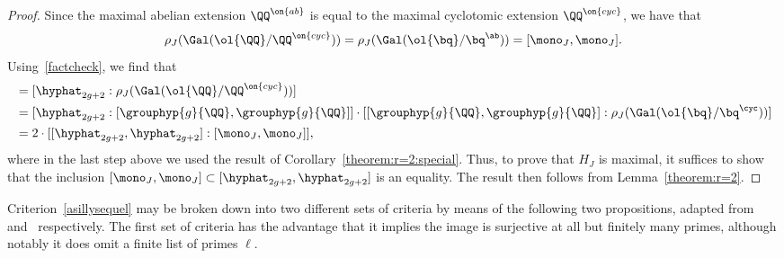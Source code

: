 \begin{proof}
Since the maximal abelian extension $\QQ^{\on{ab}}$ is equal to the maximal cyclotomic extension $\QQ^{\on{cyc}}$, we have that
\begin{equation}\label{factcheck}
\rho_J(\Gal(\ol{\QQ}/\QQ^{\on{cyc}})) = \rho_J(\Gal(\ol{\bq}/\bq^{\ab})) = [\mono_J , \mono_J].
\end{equation}
Using~\eqref{factcheck}, we find that
\begin{align*}
[\grouphyp{g}{\QQ} : \mono_J] & = [\hyphat_{2g+2} : \rho_J(\Gal(\ol{\QQ}/\QQ^{\on{cyc}}))] \\
& = [\hyphat_{2g+2} : [\grouphyp{g}{\QQ},\grouphyp{g}{\QQ}]] \cdot [[\grouphyp{g}{\QQ}, \grouphyp{g}{\QQ}] : \rho_J(\Gal(\ol{\bq}/\bq^{\cyc}))] \\
& = 2 \cdot [[\hyphat_{2g+2}, \hyphat_{2g+2}] : [\mono_J, \mono_J]] ,
\end{align*}
where in the last step above we used the result of Corollary~\ref{theorem:r=2:special}. Thus, to prove that $H_J$ is maximal, it suffices to show that the inclusion $[\mono_J, \mono_J] \subset [\hyphat_{2g+2}, \hyphat_{2g+2}]$ is an equality.
The result then follows from Lemma~\ref{theorem:r=2}.
\end{proof}

Criterion~\eqref{asillysequel} may be broken down into two different sets of criteria by means of the following two propositions, adapted from~\cite{anni2017constructing} and~\cite{seaweed} respectively. The first set of criteria has the advantage that it implies the image is surjective
at all but finitely many primes, 
although notably it does omit a finite list of primes $\ell$.

